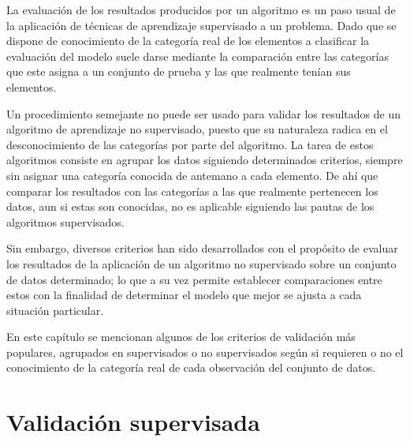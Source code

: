 La evaluación de los resultados producidos por un algoritmo es un paso usual de la aplicación de técnicas de aprendizaje supervisado a un problema.
Dado que se dispone de conocimiento de la categoría real de los elementos a clasificar la evaluación del modelo suele darse mediante la comparación entre las categorías que este asigna a un conjunto de prueba y las que realmente tenían sus elementos.

Un procedimiento semejante no puede ser usado para validar los resultados de un algoritmo de aprendizaje no supervisado, puesto que su naturaleza radica en el desconocimiento de las categorías por parte del algoritmo.
La tarea de estos algoritmos consiste en agrupar los datos siguiendo determinados criterios, siempre sin asignar una categoría conocida de antemano a cada elemento.
De ahí que comparar los resultados con las categorías a las que realmente pertenecen los datos, aun si estas son conocidas, no es aplicable siguiendo las pautas de los algoritmos supervisados.

Sin embargo, diversos criterios han sido desarrollados con el propósito de evaluar los resultados de la aplicación de un algoritmo no supervisado sobre un conjunto de datos determinado;
lo que a su vez permite establecer comparaciones entre estos con la finalidad de determinar el modelo que mejor se ajusta a cada situación particular.

En este capítulo se mencionan algunos de los criterios de validación más populares, agrupados en supervisados o no supervisados según si requieren o no el conocimiento de la categoría real de cada observación del conjunto de datos.

\section{Validación supervisada}\label{sec:validaciónSupervisada}


%